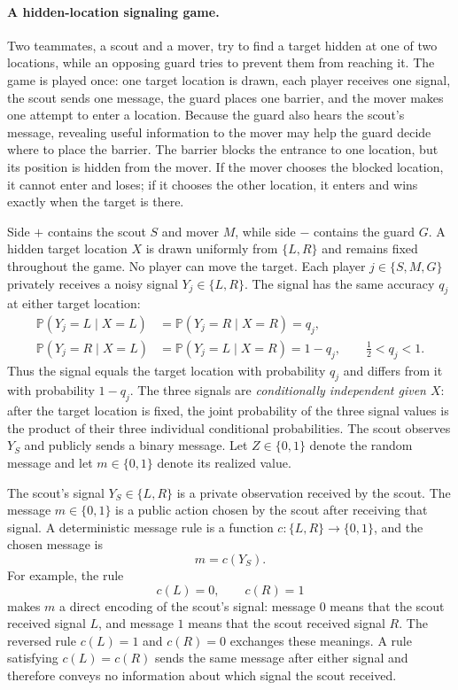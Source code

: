 \paragraph{A hidden-location signaling game.}
Two teammates, a scout and a mover, try to find a target hidden at one of two locations, while an opposing guard tries to prevent them from reaching it. The game is played once: one target location is drawn, each player receives one signal, the scout sends one message, the guard places one barrier, and the mover makes one attempt to enter a location. Because the guard also hears the scout's message, revealing useful information to the mover may help the guard decide where to place the barrier. The barrier blocks the entrance to one location, but its position is hidden from the mover. If the mover chooses the blocked location, it cannot enter and loses; if it chooses the other location, it enters and wins exactly when the target is there.

Side $+$ contains the scout $S$ and mover $M$, while side $-$ contains the guard $G$. A hidden target location $X$ is drawn uniformly from $\{L,R\}$ and remains fixed throughout the game. No player can move the target. Each player $j\in\{S,M,G\}$ privately receives a noisy signal $Y_j\in\{L,R\}$. The signal has the same accuracy $q_j$ at either target location:
\[
\begin{aligned}
    \mathbb{P}(Y_j=L\mid X=L)
    &=
    \mathbb{P}(Y_j=R\mid X=R)
    =q_j,
    \\
    \mathbb{P}(Y_j=R\mid X=L)
    &=
    \mathbb{P}(Y_j=L\mid X=R)
    =1-q_j,
    \qquad
    \frac12<q_j<1.
\end{aligned}
\]
Thus the signal equals the target location with probability $q_j$ and differs from it with probability $1-q_j$. The three signals are \emph{conditionally independent given $X$}: after the target location is fixed, the joint probability of the three signal values is the product of their three individual conditional probabilities. The scout observes $Y_S$ and publicly sends a binary message. Let $Z\in\{0,1\}$ denote the random message and let $m\in\{0,1\}$ denote its realized value.

The scout's signal $Y_S\in\{L,R\}$ is a private observation received by the scout. The message $m\in\{0,1\}$ is a public action chosen by the scout after receiving that signal. A deterministic message rule is a function $c:\{L,R\}\to\{0,1\}$, and the chosen message is
\[
    m=c(Y_S).
\]
For example, the rule
\[
    c(L)=0,
    \qquad
    c(R)=1
\]
makes $m$ a direct encoding of the scout's signal: message $0$ means that the scout received signal $L$, and message $1$ means that the scout received signal $R$. The reversed rule $c(L)=1$ and $c(R)=0$ exchanges these meanings. A rule satisfying $c(L)=c(R)$ sends the same message after either signal and therefore conveys no information about which signal the scout received.

